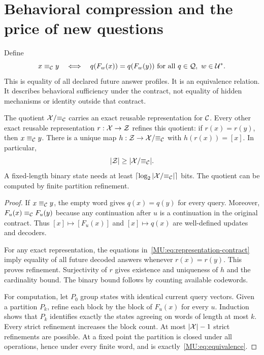 \section{Behavioral compression and the price of new questions}\label{MU:sec:quotients}
Define
\begin{equation}\label{MU:eq:equivalence}
x\equiv_{\mathcal C} y\quad\Longleftrightarrow\quad q(F_w(x))=q(F_w(y))\ \text{for all }q\in\mathcal Q,\ w\in\mathcal U^*.
\end{equation}
This is equality of all declared future answer profiles. It is an equivalence relation. It describes behavioral sufficiency under the contract, not equality of hidden mechanisms or identity outside that contract.

\begin{MUtheorem}\label{MU:thm:quotient}
The quotient $\mathcal X/{\equiv_{\mathcal C}}$ carries an exact reusable representation for $\mathcal C$. Every other exact reusable representation $r:\mathcal X\to\mathcal Z$ refines this quotient: if $r(x)=r(y)$, then $x\equiv_{\mathcal C} y$. There is a unique map $h:\mathcal Z\to\mathcal X/{\equiv_{\mathcal C}}$ with $h(r(x))=[x]$. In particular,
\[
|\mathcal Z|\geq|\mathcal X/{\equiv_{\mathcal C}}|.
\]
A fixed-length binary state needs at least $\lceil\log_2|\mathcal X/{\equiv_{\mathcal C}}|\rceil$ bits. The quotient can be computed by finite partition refinement.
\end{MUtheorem}
\begin{proof}
If $x\equiv_{\mathcal C} y$, the empty word gives $q(x)=q(y)$ for every query. Moreover, $F_u(x)\equiv_{\mathcal C} F_u(y)$ because any continuation after $u$ is a continuation in the original contract. Thus $[x]\mapsto[F_u(x)]$ and $[x]\mapsto q(x)$ are well-defined updates and decoders.

For any exact representation, the equations in~\eqref{MU:eq:representation-contract} imply equality of all future decoded answers whenever $r(x)=r(y)$. This proves refinement. Surjectivity of $r$ gives existence and uniqueness of $h$ and the cardinality bound. The binary bound follows by counting available codewords.

For computation, let $P_0$ group states with identical current query vectors. Given a partition $P_k$, refine each block by the block of $F_u(x)$ for every $u$. Induction shows that $P_k$ identifies exactly the states agreeing on words of length at most $k$. Every strict refinement increases the block count. At most $|\mathcal X|-1$ strict refinements are possible. At a fixed point the partition is closed under all operations, hence under every finite word, and is exactly~\eqref{MU:eq:equivalence}.
\end{proof}

